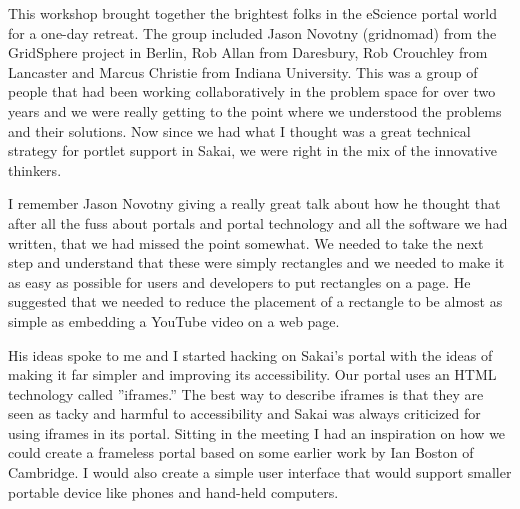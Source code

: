 \documentclass[12pt]{book}
\begin{document}
This workshop brought together the brightest folks in the
eScience portal world for a one-day retreat.  The group included Jason
Novotny (gridnomad) from the GridSphere project in Berlin, Rob Allan
from Daresbury, Rob Crouchley from Lancaster and Marcus Christie
from Indiana University.
This was a group of people that had been
working collaboratively in the problem space for over two years
and we were really getting to the point where we understood the
problems and their solutions.  Now since we had what I thought
was a great technical strategy for portlet support in Sakai, we
were right in the mix of the innovative thinkers.

I remember Jason Novotny giving a really great talk about how he
thought that after all the fuss about portals and portal
technology and all the software we had written, that we had missed
the point somewhat.   We needed to take the next step and
understand that these were simply rectangles and we needed to make
it as easy as possible for users and developers to put rectangles
on a page.  He suggested that we needed to reduce the placement of
a rectangle to be almost as simple as embedding a YouTube video
on a web page.

His ideas spoke to me and I started hacking on Sakai's portal
with the ideas of making it far simpler and improving its
accessibility.   Our portal uses an HTML technology called
''iframes.''  The best way to describe iframes is that they are
seen as tacky and harmful to accessibility and Sakai was always
criticized for using iframes in its portal.  Sitting in the meeting
I had an inspiration on how we could create a frameless portal
based on some earlier work by Ian Boston of Cambridge.
I would also create a simple user interface that would support
smaller portable device like phones and hand-held computers.
\end{document}

